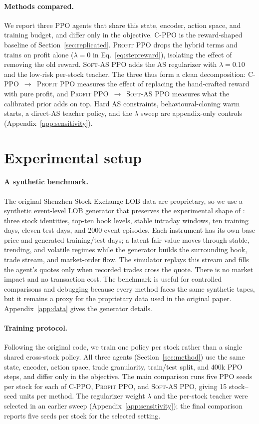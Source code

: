 \documentclass{article}
\newcommand{\softas}{\textsc{Soft-AS PPO}}
\newcommand{\cppo}{\textsc{C-PPO}}
\newcommand{\profitppo}{\textsc{Profit PPO}}
\begin{document}
\paragraph{Methods compared.}
We report three PPO agents that share this state, encoder, action space, and training budget, and differ only in the objective. \cppo{} is the reward-shaped baseline of Section~\ref{sec:replicated}. \profitppo{} drops the hybrid terms and trains on profit alone ($\lambda=0$ in Eq.~\eqref{eq:stepreward}), isolating the effect of removing the old reward. \softas{} adds the AS regularizer with $\lambda=0.10$ and the low-risk per-stock teacher. The three thus form a clean decomposition: \cppo{}~$\to$~\profitppo{} measures the effect of replacing the hand-crafted reward with pure profit, and \profitppo{}~$\to$~\softas{} measures what the calibrated prior adds on top. Hard AS constraints, behavioural-cloning warm starts, a direct-AS teacher policy, and the $\lambda$ sweep are appendix-only controls (Appendix~\ref{app:sensitivity}).



\section{Experimental setup}
\label{sec:setup}

\paragraph{A synthetic benchmark.}
The original Shenzhen Stock Exchange LOB data are proprietary, so we use a synthetic event-level LOB generator that preserves the experimental shape of \citet{guo2023mm}: three stock identities, top-ten book levels, stable intraday windows, ten training days, eleven test days, and 2000-event episodes.
Each instrument has its own base price and generated training/test days; a latent fair value moves through stable, trending, and volatile regimes while the generator builds the surrounding book, trade stream, and market-order flow. The simulator replays this stream and fills the agent's quotes only when recorded trades cross the quote. There is no market impact and no transaction cost. The benchmark is useful for controlled comparisons and debugging because every method faces the same synthetic tapes, but it remains a proxy for the proprietary data used in the original paper. Appendix~\ref{app:data} gives the generator details.

\paragraph{Training protocol.}
Following the original code, we train one policy per stock rather than a single shared cross-stock policy. All three agents (Section~\ref{sec:method}) use the same state, encoder, action space, trade granularity, train/test split, and 400k PPO steps, and differ only in the objective. The main comparison runs five PPO seeds per stock for each of \cppo{}, \profitppo{}, and \softas{}, giving 15 stock--seed units per method. The regularizer weight $\lambda$ and the per-stock teacher were selected in an earlier sweep (Appendix~\ref{app:sensitivity}); the final comparison reports five seeds per stock for the selected setting.
\end{document}

